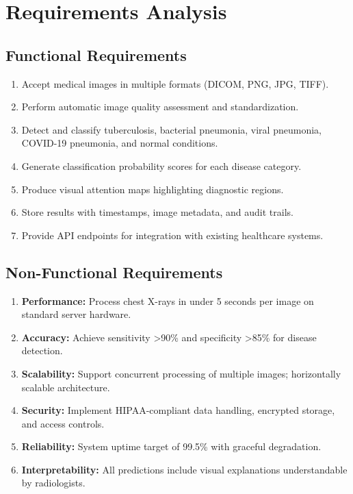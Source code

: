 {\section{Requirements Analysis}

\subsection{Functional Requirements}

\begin{enumerate}
    \item Accept medical images in multiple formats (DICOM, PNG, JPG, TIFF).
    \item Perform automatic image quality assessment and standardization.
    \item Detect and classify tuberculosis, bacterial pneumonia, viral pneumonia, COVID-19 pneumonia, and normal conditions.
    \item Generate classification probability scores for each disease category.
    \item Produce visual attention maps highlighting diagnostic regions.
    \item Store results with timestamps, image metadata, and audit trails.
    \item Provide API endpoints for integration with existing healthcare systems.
\end{enumerate}

\subsection{Non-Functional Requirements}

\begin{enumerate}
    \item \textbf{Performance:} Process chest X-rays in under 5 seconds per image on standard server hardware.
    \item \textbf{Accuracy:} Achieve sensitivity \textgreater 90\% and specificity \textgreater 85\% for disease detection.
    \item \textbf{Scalability:} Support concurrent processing of multiple images; horizontally scalable architecture.
    \item \textbf{Security:} Implement HIPAA-compliant data handling, encrypted storage, and access controls.
    \item \textbf{Reliability:} System uptime target of 99.5\% with graceful degradation.
    \item \textbf{Interpretability:} All predictions include visual explanations understandable by radiologists.
\end{enumerate}

}
